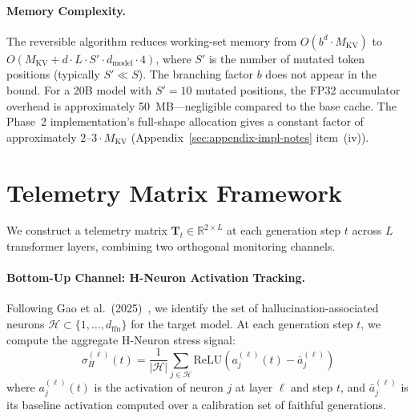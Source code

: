 \documentclass{article}
\begin{document}
\paragraph{Memory Complexity.} The reversible algorithm reduces working-set memory from $O(b^d \cdot M_{\text{KV}})$ to $O(M_{\text{KV}} + d \cdot L \cdot S' \cdot d_{\text{model}} \cdot 4)$, where $S'$ is the number of mutated token positions (typically $S' \ll S$). The branching factor $b$ does not appear in the bound. For a 20B model with $S' = 10$ mutated positions, the FP32 accumulator overhead is approximately 50~MB---negligible compared to the base cache. The Phase~2 implementation's full-shape allocation gives a constant factor of approximately $2$--$3 \cdot M_{\text{KV}}$ (Appendix~\ref{sec:appendix-impl-notes} item~(iv)).

\section{Telemetry Matrix Framework}\label{sec:appendix-telemetry}

We construct a telemetry matrix $\mathbf{T}_t \in \mathbb{R}^{2 \times L}$ at each generation step $t$ across $L$ transformer layers, combining two orthogonal monitoring channels.

\paragraph{Bottom-Up Channel: H-Neuron Activation Tracking.}
Following Gao et al.\ (2025)~\cite{gao2025hneurons}, we identify the set of hallucination-associated neurons $\mathcal{H} \subset \{1, \ldots, d_{\text{ffn}}\}$ for the target model. At each generation step $t$, we compute the aggregate H-Neuron stress signal:
\begin{equation}
\sigma_H^{(\ell)}(t) = \frac{1}{|\mathcal{H}|} \sum_{j \in \mathcal{H}} \text{ReLU}\left(a_j^{(\ell)}(t) - \bar{a}_j^{(\ell)}\right)
\label{eq:hneuron_stress}
\end{equation}
where $a_j^{(\ell)}(t)$ is the activation of neuron $j$ at layer $\ell$ and step $t$, and $\bar{a}_j^{(\ell)}$ is its baseline activation computed over a calibration set of faithful generations.
\end{document}
